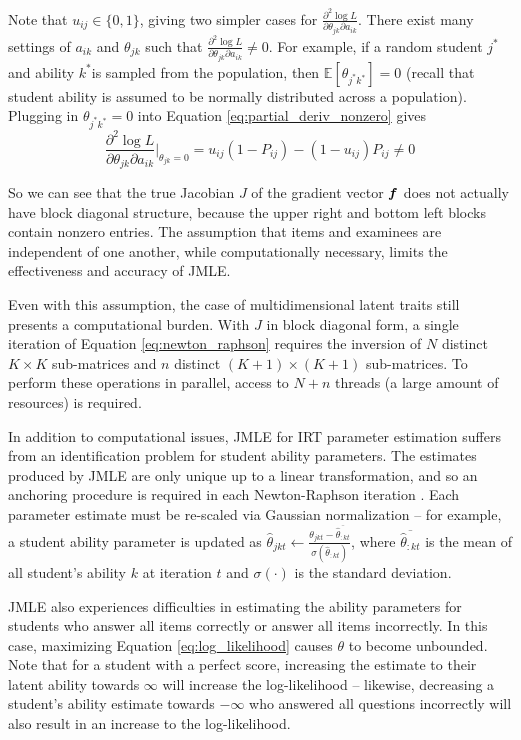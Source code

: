 Note that $u_{ij} \in \{0,1\}$, giving two simpler cases for $\frac{\partial^2 \log L}{\partial \theta_{jk} \partial a_{ik}}$. There exist many settings of $a_{ik}$ and $\theta_{jk}$ such that  $\frac{\partial^2 \log L}{\partial \theta_{jk} \partial a_{ik}} \not = 0$. For example, if a random student $j^*$ and ability $k^*$is sampled from the population, then $\mathbb{E}[\theta_{j^*k^*}] = 0$ (recall that student ability is assumed to be normally distributed across a population). Plugging in $\theta_{j^*k^*} = 0$ into Equation \ref{eq:partial_deriv_nonzero} gives
\[\frac{\partial^2 \log L}{\partial \theta_{jk} \partial a_{ik}}\Big|_{\theta_{jk}=0} = u_{ij}(1-P_{ij}) - (1-u_{ij})P_{ij} \not= 0 \]

So we can see that the true Jacobian $J$ of the gradient vector $\boldsymbol{f}$ does not actually have block diagonal structure, because the upper right and bottom left blocks contain nonzero entries. The assumption that items and examinees are independent of one another, while computationally necessary, limits the effectiveness and accuracy of JMLE. 

Even with this assumption, the case of multidimensional latent traits still presents a computational burden. With $J$ in block diagonal form, a single iteration of Equation \ref{eq:newton_raphson} requires the inversion of $N$ distinct $K\times K$ sub-matrices and $n$ distinct $(K+1) \times (K+1)$ sub-matrices. To perform these operations in parallel, access to $N + n$ threads (a large amount of resources) is required.

In addition to computational issues, JMLE for IRT parameter estimation suffers from an identification problem for student ability parameters. The estimates produced by JMLE are only unique up to a linear transformation, and so an anchoring procedure is required in each Newton-Raphson iteration \cite{baker_kim2004}. Each parameter estimate must be re-scaled via Gaussian normalization -- for example, a student ability parameter is updated as $\hat \theta_{jkt} \gets \frac{\theta_{jkt} - \overline{\hat \theta_{:kt}}}{\sigma(\hat \theta_{:kt})}$, where $\overline{\hat \theta_{:kt}}$ is the mean of all student's ability $k$ at iteration $t$ and  $\sigma(\cdot)$ is the standard deviation.

JMLE also experiences difficulties in estimating the ability parameters for students who answer all items correctly or answer all items incorrectly. In this case, maximizing Equation \ref{eq:log_likelihood} causes $\theta$ to become unbounded. Note that for a student with a perfect score, increasing the estimate to their latent ability towards $\infty$ will increase the log-likelihood -- likewise, decreasing a student's ability estimate towards $-\infty$ who answered all questions incorrectly will also result in an increase to the log-likelihood.

